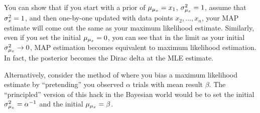 You can show that if you start with a prior of $\mu_{\mu_x} = x_1$, $\sigma^2_{\mu_x}
= 1$, assume that $\sigma^2_x = 1$, and then one-by-one updated with data
points $x_2, \ldots, x_n$, your MAP estimate will come out the same as
your maximum likelihood estimate. Similarly, even if you set the initial
$\mu_{\mu_x} = 0$, you can see that in the limit as your initial $\sigma^2_{\mu_x} \to
0$, MAP estimation becomes equivalent to maximum likelihood estimation.
In fact, the posterior becomes the Dirac delta at the MLE estimate.

Alternatively, consider the method of  where you
bias a maximum likelihood estimate by ``pretending'' you observed
$\alpha$ trials with mean result $\beta$. The ``principled'' version of
this hack in the Bayesian world would be to set the initial $\sigma^2_{\mu_x} =
\alpha^{-1}$ and the initial $\mu_{\mu_x} = \beta$.
